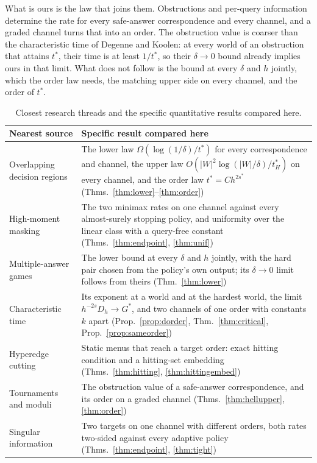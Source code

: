 What is ours is the law that joins them. Obstructions and per-query information determine the
rate for every safe-answer correspondence and every channel, and a graded channel turns that
into an order. The obstruction value is coarser than the characteristic time of Degenne and
Koolen: at every world of an obstruction that attains $t^{*}$, their time is at least $1/t^{*}$,
so their $\delta\to0$ bound already implies ours in that limit. What does not follow is the
bound at every $\delta$ and $h$ jointly, which the order law needs, the matching upper side on
every channel, and the order of $t^{*}$.

\begin{table}[h]
\caption{Closest research threads and the specific quantitative results compared here.}
\label{tab:prior}
\centering
\footnotesize
\begin{tabular}{@{}p{}p{}@{}}
\toprule
Nearest source & Specific result compared here \\
\midrule
Overlapping decision regions~\cite{javdani2014} & The lower law $\Omega(\log(1/\delta)/t^{*})$
for every correspondence and channel, the upper law $O(|W|^{2}\log(|W|/\delta)/t^{*}_{H})$ on every
channel, and the order law $t^{*}=Ch^{2s^{*}}$ (Thms.~\ref{thm:lower}--\ref{thm:order}) \\
High-moment masking~\cite{grosso2014,duc2015} & The two minimax rates on one channel against
every almost-surely stopping policy, and uniformity over the linear class with a
query-free constant (Thms.~\ref{thm:endpoint}, \ref{thm:unif}) \\
Multiple-answer games~\cite{degenne2019,wangyou2026} & The lower bound at every $\delta$ and
$h$ jointly, with the hard pair chosen from the policy's own output; its $\delta\to0$ limit
follows from theirs (Thm.~\ref{thm:lower}) \\
Characteristic time~\cite{degenne2019} & Its exponent at a world and at the hardest world, the
limit $h^{-2s}D_h\to G^*$, and two channels of one order with constants $k$ apart
(Prop.~\ref{prop:dorder}, Thm.~\ref{thm:critical}, Prop.~\ref{prop:sameorder}) \\
Hyperedge cutting~\cite{javdani2014} & Static menus that reach a target order: exact hitting
condition and a hitting-set embedding (Thms.~\ref{thm:hitting}, \ref{thm:hittingembed}) \\
Tournaments and moduli~\cite{lecam1973,birge1983,donoho1991} & The obstruction value of a
safe-answer correspondence, and its order on a graded channel (Thms.~\ref{thm:hellupper},
\ref{thm:order}) \\
Singular information~\cite{rotnitzky2000,heinrich2018,honguyen2015} & Two targets on one
channel with different orders, both rates two-sided against every adaptive policy
(Thms.~\ref{thm:endpoint}, \ref{thm:tight}) \\
\bottomrule
\end{tabular}
\end{table}

